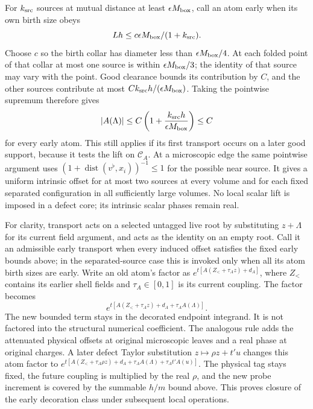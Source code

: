 For $k_{\rm src}$ sources at mutual distance at least
$\epsilon M_{\rm box}$, call an atom early when its own birth size obeys
\begin{equation}\label{xyh:early-source-scales}
 Lh\le c\epsilon M_{\rm box}/(1+k_{\rm src}).
\end{equation}
Choose $c$ so the birth collar has diameter less than
$\epsilon M_{\rm box}/4$. At each folded point of that collar at most one source
is within $\epsilon M_{\rm box}/3$; the identity of that source may vary
with the point. Good clearance bounds its contribution by $C$, and the
other sources contribute at most
$Ck_{\rm src}h/(\epsilon M_{\rm box})$. Taking the pointwise supremum
therefore gives
\[
 |A(\Lambda)|\le C\left(1+
       \frac{k_{\rm src}h}{\epsilon M_{\rm box}}\right)\le C
\]
for every early atom. This still applies if its first transport occurs
on a later good support, because it tests the lift on $\mathcal C_A$.
At a microscopic edge the same pointwise argument uses
$(1+\operatorname{dist}(v^\flat,x_i))^{-1}\le1$ for the possible near source.
It gives a uniform intrinsic offset for at most two sources at every
volume and for each fixed separated configuration in all sufficiently
large volumes. No local scalar lift is imposed in a defect core; its
intrinsic scalar phases remain real.

For clarity, transport acts on a selected untagged live root by substituting
$z+\Lambda$ for its current field argument, and acts as the identity on an
empty root. Call it an admissible early transport when every induced
offset satisfies the fixed early bounds above; in the separated-source
case this is invoked only when all its atom birth sizes are early.
Write an old atom's factor as
$e^{t[A(Z_<+\tau_A z)+d_A]}$, where $Z_<$ contains its earlier
shell fields and $\tau_A\in[0,1]$ is its current coupling. The factor becomes
\[
 e^{t[A(Z_<+\tau_A z)+d_A+\tau_A A(\Lambda)]}.
\]
The new bounded term stays in the decorated endpoint integrand. It is
not factored into the structural numerical coefficient. The analogous
rule adds the attenuated physical offsets at original microscopic leaves
and a real phase at original charges. A later defect Taylor substitution
$z\mapsto\rho z+t'u$ changes this atom factor to
$e^{t[A(Z_<+\tau_A\rho z)+d_A+\tau_A A(\Lambda)+\tau_A t'A(u)]}$.
The physical tag stays fixed,
the future coupling is multiplied by the real $\rho$, and the new probe
increment is covered by the summable $h/m$ bound above. This proves
closure of the early decoration class under subsequent local operations.

